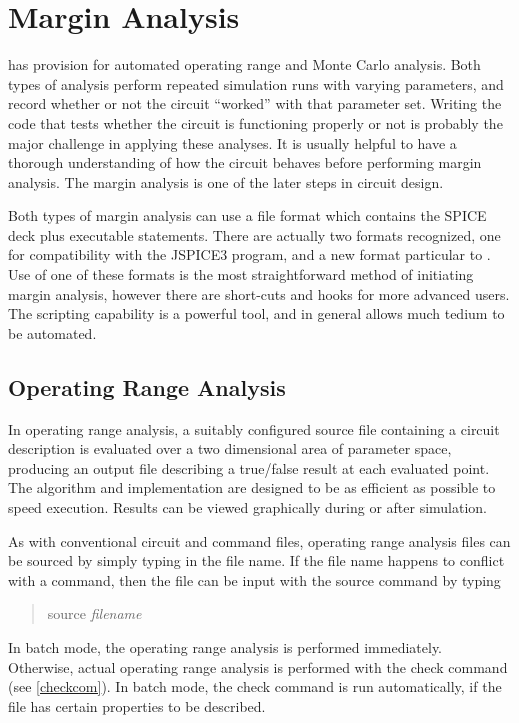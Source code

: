 \chapter{Margin Analysis}


{\WRspice} has provision for automated operating range and Monte Carlo
analysis.  Both types of analysis perform repeated simulation runs
with varying parameters, and record whether or not the circuit
``worked'' with that parameter set. Writing the code that tests
whether the circuit is functioning properly or not is probably the
major challenge in applying these analyses.  It is usually helpful
to have a thorough understanding of how the circuit behaves before
performing margin analysis.  The margin analysis is one of the later
steps in circuit design.

Both types of margin analysis can use a file format which contains the
SPICE deck plus executable statements.  There are actually two formats
recognized, one for compatibility with the JSPICE3 program, and a new
format particular to {\WRspice}.  Use of one of these formats is the
most straightforward method of initiating margin analysis, however
there are short-cuts and hooks for more advanced users.  The scripting
capability is a powerful tool, and in general allows much tedium to be
automated.


\section{Operating Range Analysis}
\label{oprange}


In operating range analysis, a suitably configured source file
containing a circuit description is evaluated over a two dimensional
area of parameter space, producing an output file describing a
true/false result at each evaluated point.  The algorithm and
implementation are designed to be as efficient as possible to speed
execution.  Results can be viewed graphically during or after
simulation.

As with conventional circuit and command files, operating range
analysis files can be sourced by simply typing in the file name.  If
the file name happens to conflict with a {\WRspice} command, then the
file can be input with the {\cb source} command by typing
\begin{quote}
{\vt source} {\it filename}
\end{quote}
In batch mode, the operating range analysis is performed immediately. 
Otherwise, actual operating range analysis is performed with the {\cb
check} command (see \ref{checkcom}).  In batch mode, the {\cb check}
command is run automatically, if the file has certain properties to be
described.

